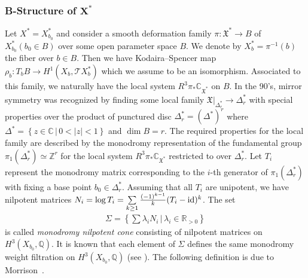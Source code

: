 \documentclass[10pt,a4paper]{amsart}
\numberwithin{equation}{section}
\begin{document}
\subsubsection[B-Structure of $X^*$]{B-Structure of $\boldsymbol{X^*}$} Let $X^{*}=X_{b_{0}}^{*}$ and consider
a smooth deformation family $\pi\colon \mathfrak{X}^{*}\to B$ of $X_{b_{0}}^{*}(b_{0}\in B)$ over some open parameter space $B$. We denote by $X_{b}^{*}=\pi^{-1}(b)$ the fiber over $b\in B$. Then we have Kodaira--Spencer map $\rho_{b}\colon T_{b}B\to H^{1}(X_{b},\mathcal{T}X_{b}^{*})$
which we assume to be an isomorphism. Associated to this family, we naturally have the local system $R^{3}\pi_{*}\mathbb{C}_{\mathfrak{X}^{*}}$
on $B$. In the 90's, mirror symmetry was recognized by finding some local family $\mathfrak{X}|_{\Delta_{r}^{*}}\to\Delta_{r}^{*}$ with special
properties over the product of punctured disc $\Delta_{r}^{*}=(\Delta^{*})^{r}$ where $\Delta^{*}=\left\{ z\in\mathbb{C}\,|\,0<|z|<1\right\} $ and
$\dim B=r$. The required properties for the local family are described by the monodromy representation of the fundamental group $\pi_{1}(\Delta_{r}^{*})\simeq\mathbb{Z}^{r}$ for the local system $R^{3}\pi_{*}\mathbb{C}_{\mathfrak{X}^{*}}$ restricted to over $\Delta_{r}^{*}$. Let $T_{i}$ represent the monodromy matrix corresponding to the $i$-th generator of $\pi_{1}(\Delta_{r}^{*})$ with fixing a base point $b_{0}\in\Delta_{r}^{*}$. Assuming that all $T_{i}$ are unipotent, we have nilpotent matrices $N_{i}=\log T_{i}=\sum\limits_{k\geq1}\frac{(-1)^{k-1}}{k}(T_{i}-{\rm id})^{k}$. The set
\begin{gather}
\Sigma=\left\{ \sum\lambda_{i}N_{i}\,|\,\lambda_{i}\in\mathbb{R}_{>0}\right\} \label{eq:Mon-cone-Sig}
\end{gather}
is called \textit{monodromy nilpotent cone} consisting of nilpotent matrices on $H^{3}(X_{b_{0}},\mathbb{\mathbb{Q}})$. It is known that each element of $\Sigma$ defines the same monodromy weight filtration on $H^{3}(X_{b_{0}},\mathbb{Q})$ (see \cite[Theorem~1.9]{Griffiths}). The following definition is due to Morrison~\cite{MoLCSL}.
\end{document}
